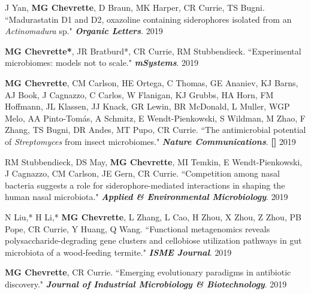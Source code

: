 \begin{cvpubs}
\cvpub
{J Yan, \textbf{MG Chevrette}, D Braun, MK Harper, CR Currie, TS Bugni. ``Madurastatin D1 and D2, oxazoline containing siderophores isolated from an \textit{Actinomadura} sp." \textit{\textbf{Organic Letters}}. \textbf{\textit{}}}
{2019}

\cvpub
{\textbf{MG Chevrette*}, JR Bratburd*, CR Currie, RM Stubbendieck. ``Experimental microbiomes: models not to scale." \textit{\textbf{mSystems}}. \textbf{\textit{}}}
{2019}

\cvpub
{\textbf{MG Chevrette}, CM Carlson, HE Ortega, C Thomas, GE Ananiev, KJ Barns, AJ Book, J Cagnazzo, C Carlos, W Flanigan, KJ Grubbs, HA Horn, FM Hoffmann, JL Klassen, JJ Knack, GR Lewin, BR McDonald, L Muller, WGP Melo, AA Pinto-Tom\'{a}s, A Schmitz, E Wendt-Pienkowski, S Wildman, M Zhao, F Zhang, TS Bugni, DR Andes, MT Pupo, CR Currie. ``The antimicrobial potential of \textit{Streptomyces} from insect microbiomes." \textit{\textbf{Nature Communications}}. \textbf{\textit{}} \linebreak \textbf{[\textit{}]}}
{2019}

\cvpub
{RM Stubbendieck, DS May, \textbf{MG Chevrette}, MI Temkin, E Wendt-Pienkowski, J Cagnazzo, CM Carlson, JE Gern, CR Currie. ``Competition among nasal bacteria suggests a role for siderophore-mediated interactions in shaping the human nasal microbiota." \textit{\textbf{Applied \& Environmental Microbiology}}. \textbf{\textit{}}}
{2019}

\cvpub
{N Liu,* H Li,* \textbf{MG Chevrette}, L Zhang, L Cao, H Zhou, X Zhou, Z Zhou, PB Pope, CR Currie, Y Huang, Q Wang. ``Functional metagenomics reveals polysaccharide-degrading gene clusters and cellobiose utilization pathways in gut microbiota of a wood-feeding termite." \textit{\textbf{ISME Journal}}. \textbf{\textit{}}}
{2019}

\cvpub
{\textbf{MG Chevrette}, CR Currie. ``Emerging evolutionary paradigms in antibiotic discovery." \textit{\textbf{Journal of Industrial Microbiology \& Biotechnology}}. \textbf{\textit{}}}
{2019}


\end{cvpubs}
